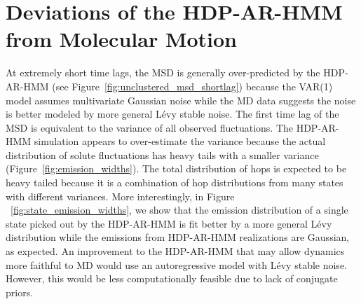 \documentclass{article}
\begin{document}
  \section{Deviations of the HDP-AR-HMM from Molecular Motion}\label{section:shorttimes_msd}
  
  At extremely short time lags, the MSD is generally over-predicted by the HDP-AR-HMM
  (see Figure~\ref{fig:unclustered_msd_shortlag}) because the VAR(1) model assumes
  multivariate Gaussian noise while the MD data suggests the noise is better 
  modeled by more general L\'evy stable noise. The first time lag of the MSD is
  equivalent to the variance of all observed fluctuations. 
  The HDP-AR-HMM simulation appears to over-estimate the variance because the actual 
  distribution of solute fluctuations has 
  heavy tails with a smaller variance (Figure~\ref{fig:emission_widths}).
  The total distribution of hops is expected to be heavy tailed because it is a
  combination of hop distributions from many states with different variances. More
  interestingly, in Figure ~\ref{fig:state_emission_widths}, we show that the 
  emission distribution of a single state picked out by the HDP-AR-HMM is fit better by
  a more general L\'evy distribution while the emissions from HDP-AR-HMM realizations are
  Gaussian, as expected. An improvement to the HDP-AR-HMM that may allow dynamics more 
  faithful to MD would use an autoregressive model with L\'evy stable noise. However,
  this would be less computationally feasible due to lack of conjugate priors.
  
\end{document}
